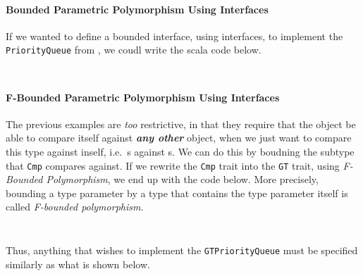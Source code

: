 \paragraph{Bounded Parametric Polymorphism Using Interfaces}\label{par:OOP_Bounded_Parametric_Polymorphism_Interfaces}
If we wanted to define a bounded interface, using interfaces, to implement the \texttt{PriorityQueue} from , we coudl write the scala code below.
\inputminted[frame=lines,linenos]{scala}{./EDAP05-Concepts_Programming_Languages-Sections/Object_Oriented_Programming/Code/Cmp.scala}
\inputminted[frame=lines,linenos]{scala}{./EDAP05-Concepts_Programming_Languages-Sections/Object_Oriented_Programming/Code/PriorityQueue.scala}

\paragraph{F-Bounded Parametric Polymorphism Using Interfaces}\label{par:OOP_F_Bounded_Parametric_Polymorphism_Interfaces}
The previous examples are \textit{too} restrictive, in that they require that the object  be able to compare itself against \emph{\textbf{any other}} object, when we just want to compare this type against inself, i.e.\ s against s.
We can do this by boudning the subtype that \texttt{Cmp} compares against.
If we rewrite the \texttt{Cmp} trait into the \texttt{GT} trait, using \emph{F-Bounded Polymorphism}, we end up with the code below.
More precisely, bounding a type parameter by a type that contains the type parameter itself is called \emph{F-bounded polymorphism}.
\inputminted[frame=lines,linenos]{scala}{./EDAP05-Concepts_Programming_Languages-Sections/Object_Oriented_Programming/Code/GT.scala}
\inputminted[frame=lines,linenos]{scala}{./EDAP05-Concepts_Programming_Languages-Sections/Object_Oriented_Programming/Code/GTPriorityQueue.scala}

Thus, anything that wishes to implement the \texttt{GTPriorityQueue} must be specified similarly as what is shown below.
\inputminted[frame=lines,linenos]{scala}{./EDAP05-Concepts_Programming_Languages-Sections/Object_Oriented_Programming/Code/UserRequest.scala}

